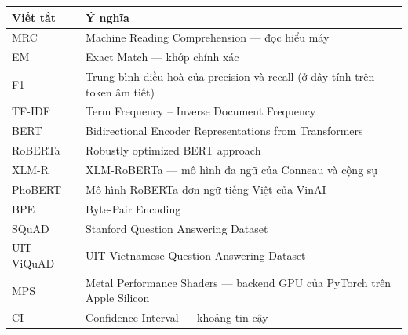 \begin{center}
\renewcommand{\arraystretch}{1.15}
\begin{tabularx}{\textwidth}{@{}l L@{}}
\toprule
\textbf{Viết tắt} & \textbf{Ý nghĩa} \\
\midrule
MRC       & Machine Reading Comprehension --- đọc hiểu máy \\
EM        & Exact Match --- khớp chính xác \\
F1        & Trung bình điều hoà của precision và recall (ở đây tính trên token âm tiết) \\
TF-IDF    & Term Frequency -- Inverse Document Frequency \\
BERT      & Bidirectional Encoder Representations from Transformers \\
RoBERTa   & Robustly optimized BERT approach \\
XLM-R     & XLM-RoBERTa --- mô hình đa ngữ của Conneau và cộng sự \\
PhoBERT   & Mô hình RoBERTa đơn ngữ tiếng Việt của VinAI \\
BPE       & Byte-Pair Encoding \\
SQuAD     & Stanford Question Answering Dataset \\
UIT-ViQuAD & UIT Vietnamese Question Answering Dataset \\
MPS       & Metal Performance Shaders --- backend GPU của PyTorch trên Apple Silicon \\
CI        & Confidence Interval --- khoảng tin cậy \\
\bottomrule
\end{tabularx}
\end{center}

